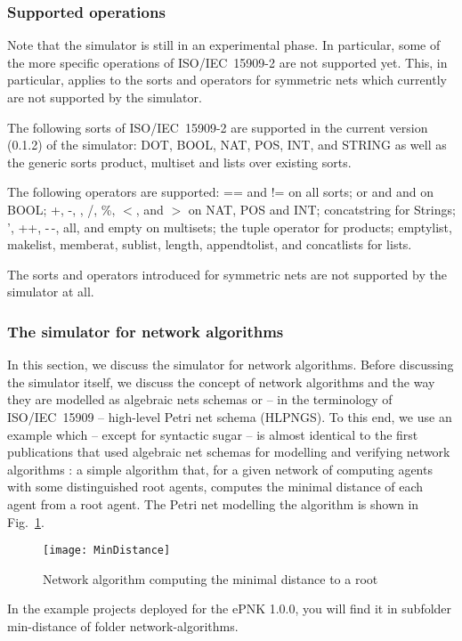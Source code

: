 \subsubsection{Supported operations}
\label{subsubsec:user:sim:supported}

Note that the simulator is still in an experimental phase. In particular, some
of the more specific operations of ISO/IEC~15909-2 are not supported yet. This,
in particular, applies to the sorts and operators for symmetric nets
which currently are not supported by the simulator.

The following sorts of ISO/IEC~15909-2 are supported in the current
version (0.1.2) of the simulator: {\sf DOT}, {\sf BOOL}, {\sf NAT}, {\sf POS},
{\sf INT}, and {\sf STRING} as well as the generic sorts product, multiset
and lists over existing sorts.

The following operators are supported:
{\sf ==} and {\sf !=} on all sorts;
{\sf or} and {\sf and} on {\sf BOOL};
{\sf +}, {\sf -},  {\sf *},  {\sf /}, {\sf \%}, $<$,  and $>$ on
{\sf NAT}, {\sf POS} and {\sf INT};
{\sf concatstring} for Strings;
{\sf '}, {\sf ++}, {\sf -\,-}, {\sf all}, and {\sf empty} on multisets;
the tuple operator for products; 
{\sf emptylist}, {\sf makelist}, {\sf memberat}, {\sf sublist}, {\sf length},
{\sf appendtolist}, and {\sf concatlists} for lists.

The sorts and operators introduced for symmetric nets are not
supported by the simulator at all.
 
\subsubsection{The simulator for network algorithms}
\label{subsubsec:user:sim:networks}

In this section, we discuss the simulator for network algorithms. Before
discussing the simulator itself, we discuss the concept of network
algorithms and the way they are modelled as algebraic nets schemas
or -- in the terminology of ISO/IEC~15909 -- high-level Petri net schema
(HLPNGS).%
To this end, we use an example which -- except for syntactic sugar --
is almost identical to the first publications that used algebraic
net schemas for modelling and verifying network algorithms%
\cite{KiRe96, WWea97, Rei98}: a simple algorithm that, for a given network
of computing agents with some distinguished root agents, computes the
minimal distance of each agent from a root agent. The Petri net modelling
the algorithm is shown in Fig.~\ref{fig:user:sim:mindistance-exmpl}.%
%
\begin{figure}[hbt!!]
  \centerline{\texttt{[image: MinDistance]}}
  \caption{Network algorithm computing the minimal distance to a root}
  \label{fig:user:sim:mindistance-exmpl}
\end{figure}
%
In the example projects deployed for the ePNK 1.0.0, you will find it
in subfolder min-distance of folder network-algorithms.

